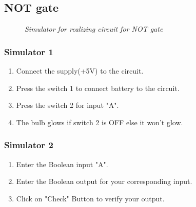 	\subsection{NOT gate}
		\begin{figure}[ht]
			\centering 
			\hfill
			\caption{\textit{Simulator for realizing circuit for NOT gate}}
		\end{figure}
		\subsubsection{Simulator 1}
			\begin{enumerate}
				\tightlist
				\item Connect the supply(+5V) to the circuit.
				\item Press the switch 1 to connect battery to the circuit.
				\item Press the switch 2 for input "A".
				\item The bulb glows if switch 2 is OFF else it won't glow.
			\end{enumerate}
		\subsubsection{Simulator 2}
			\begin{enumerate}
				\tightlist
				\item Enter the Boolean input "A".
				\item Enter the Boolean output for your corresponding input.
				\item Click on "Check" Button to verify your output.			
			\end{enumerate}

